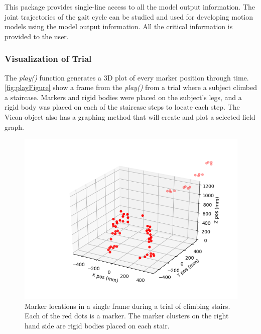 

This package provides single-line access to all the model output information. The joint trajectories of the gait cycle can be studied and used for developing motion models using the model output information. All the critical information is provided to the user.  



\subsubsection{Visualization of Trial}
The \textit{play()} function generates a 3D plot of every marker position through time. \autoref{fig:playFigure} show a frame from the \textit{play()} from a trial where a subject climbed a staircase. Markers and rigid bodies were placed on the subject's legs, and a rigid body was placed on each of the staircase steps to locate each step. The Vicon object also has a graphing method that will create and plot a selected field graph.

\begin{figure}
    \centering
    \includegraphics[scale=0.6]{images/software/play.png}
   \caption[Play Figure]{Marker locations in a single frame during a trial of climbing stairs. Each of the red dots is a marker. The marker clusters on the right hand side are rigid bodies placed on each stair. }
    \label{fig:playFigure}
\end{figure}


